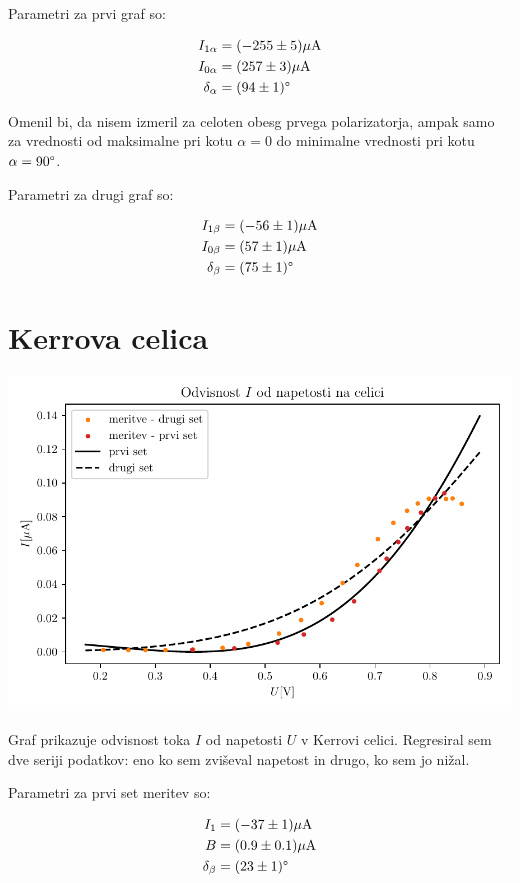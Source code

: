 \documentclass[12pt]{report}
\begin{document}
Parametri za prvi graf so:

\begin{align*}
  I_{1\alpha} &= (-255 \pm 5)\si{\mu A} \\
  I_{0\alpha} &= (257 \pm 3)\si{\mu A}  \\
  \delta_{\alpha} &= (94 \pm 1)\degree
\end{align*}


Omenil bi, da nisem izmeril za celoten obesg prvega polarizatorja, ampak samo za vrednosti od maksimalne pri kotu $\alpha = 0$ do minimalne vrednosti pri kotu $\alpha = 90\degree$. 

Parametri za drugi graf so: 

\begin{align*}
  I_{1\beta} &= (-56 \pm 1)\si{\mu A} \\
  I_{0\beta} &= (57 \pm 1)\si{\mu A}  \\
  \delta_{\beta} &= (75 \pm 1)\degree
\end{align*}


\section*{Kerrova celica}

\begin{slika}[H]
  \centering
  \includegraphics{3naloga}
  \caption{\small Graf prikazuje odvisnost toka $I$ od napetosti $U$ v Kerrovi celici. Regresiral sem dve seriji podatkov: eno ko sem zviševal napetost in drugo, ko sem jo nižal.}
\end{slika}

Parametri za prvi set meritev so: 

\begin{align*}
  I_{1} &= (-37 \pm 1)\si{\mu A}\\
  B &= (0.9 \pm 0.1)\si{\mu A} \\
  \delta_{\beta} &= (23 \pm 1)\degree
\end{align*}
\end{document}
